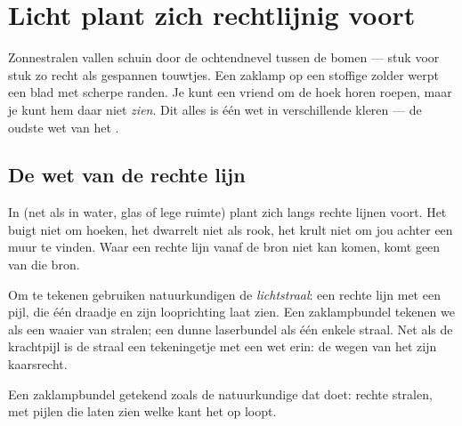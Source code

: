 \chapter{Licht plant zich rechtlijnig voort}\label{ch:g4:light-straight-lines}

Zonnestralen vallen schuin door de ochtendnevel tussen de bomen ---
stuk voor stuk zo recht als gespannen touwtjes. Een zaklamp op een
stoffige zolder werpt een blad  met scherpe randen. Je kunt een
vriend om de hoek horen roepen, maar je kunt hem daar niet \emph{zien}.
Dit alles is één wet in verschillende kleren --- de oudste wet van het
.

\section{De wet van de rechte lijn}

\begin{proposition}\label{prop:g4:light-straight-lines:law}
In  (net als in water, glas of lege ruimte) plant  zich
langs rechte lijnen voort. Het buigt niet om hoeken, het dwarrelt niet
als rook, het krult niet om jou achter een muur te vinden. Waar een
rechte lijn vanaf de bron niet kan komen, komt geen  van die
bron.
\end{proposition}

\begin{definition}[Lichtstraal]\label{def:g4:light-straight-lines:ray}
Om  te tekenen gebruiken natuurkundigen de
\emph{lichtstraal}: een rechte lijn met een pijl,
die één draadje  en zijn looprichting laat zien. Een
zaklampbundel tekenen we als een waaier van stralen; een dunne
laserbundel als één enkele straal. Net als de krachtpijl is de straal
een tekeningetje met een wet erin: de wegen van het  zijn
kaarsrecht.
\end{definition}

\begin{omfigure}

{\small Een zaklampbundel getekend zoals de natuurkundige dat doet:
rechte stralen, met pijlen die laten zien welke kant het  op
loopt.}
\end{omfigure}

